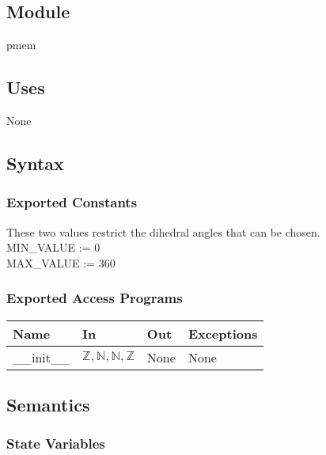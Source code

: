 \documentclass[12pt, titlepage]{article}
\begin{document}
\subsection{Module}

pmem

\subsection{Uses}

None

\subsection{Syntax}

\subsubsection{Exported Constants}

These two values restrict the dihedral angles that can be chosen.\\
\indent MIN\_VALUE := 0\\
\indent MAX\_VALUE := 360

\subsubsection{Exported Access Programs}

\begin{center}
	\begin{tabular}{p{2cm} p{4cm} p{4cm} p{2cm}}
		\hline
		\textbf{Name} & \textbf{In} & \textbf{Out} & \textbf{Exceptions} \\
		\hline
		\_\_init\_\_ & $\mathbb{Z}, \mathbb{N}, \mathbb{N}, \mathbb{Z}$ & None 
		& None \\
		\hline
	\end{tabular}
\end{center}

\subsection{Semantics}

\subsubsection{State Variables}
\end{document}
